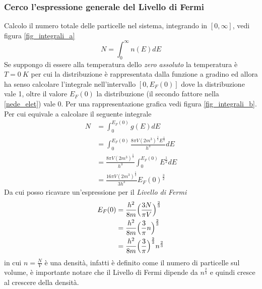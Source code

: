 \subsubsection{Cerco l'espressione generale del Livello di Fermi}
Calcolo il numero totale delle particelle nel sistema, integrando in $[0, \infty]$, vedi figura \ref{fig_integrali_a}
\begin{equation}
N = \int_0^{\infty} n(E)dE
\end{equation}
Se suppongo di essere alla temperatura dello \textit{zero assoluto} la temperatura è $T=\SI{0}{K}$ per cui la distribuzione è rappresentata dalla funzione a gradino ed allora ha senso calcolare l'integrale nell'intervallo $[0, E_F(0)]$ dove la distribuzione vale 1, oltre il valore $E_F(0)$ la distribuzione (il secondo fattore nella \ref{nede_elet}) vale 0.
Per una rappresentazione grafica vedi figura \ref{fig_integrali_b}.
Per cui equivale a calcolare il seguente integrale
\begin{equation}
\begin{split}
N & = \int_0^{E_F(0)} g(E)dE \\
& = \int_0^{E_F(0)} \frac{8 \pi V (2m^3)^{\frac{1}{2}} E^{\frac{1}{2}}}{h^3} dE \\
& = \frac{8 \pi V (2m^3)^{\frac{1}{2}}}{h^3} \int_0^{E_F(0)} E^{\frac{1}{2}} dE \\
& = \frac{16 \pi V (2m^3)^{\frac{1}{2}}}{3 h^3} E_F(0)^{\frac{3}{2}}
\label{num_parti_N}
\end{split}
\end{equation}
Da cui posso ricavare un'espressione per il \textit{Livello di Fermi}
\begin{equation}
\begin{split}
E_F(0) & = \frac{h^2}{8m}\Bigl(  \frac{3N}{\pi V}  \Bigr)^{ \frac{2}{3} } \\
& = \frac{h^2}{8m}\Bigl(  \frac{3}{\pi} n  \Bigr)^{ \frac{2}{3} } \\
& = \frac{h^2}{8m}\Bigl(  \frac{3}{\pi}  \Bigr)^{ \frac{2}{3} } n^{ \frac{2}{3} }
\end{split}
\end{equation}
in cui $n=\frac{N}{V}$ è una densità, infatti è definito come il numero di particelle sul volume, è importante notare che il Livello di Fermi dipende da $n^{ \frac{2}{3} }$ e quindi cresce al crescere della densità.


